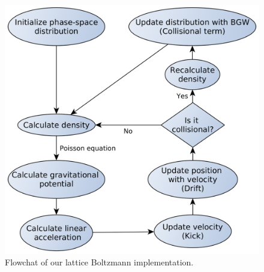 \begin{figure}[ht!]
    \centering
    \includegraphics[scale=0.2]{imag/flowchart.png}
    \caption{Flowchat of our lattice Boltzmann implementation.}
    \label{flowchart}
\end{figure}

